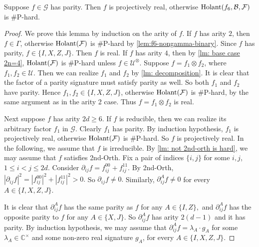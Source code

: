 \begin{lemma}\label{lm: realification when parity}
    Suppose $f\in \mathcal{G}$ has parity. 
    Then $f$ is projectively real, otherwise $\operatorname{Holant}(f_6,\mathcal{B},\mathcal{F})$ is \#P-hard.
\end{lemma}

\begin{proof}
    We prove this lemma by induction on the arity of $f$.
    If $f$ has arity $2$, then $f\in \Gamma$, otherwise $\operatorname{Holant}(\mathcal{F})$ is \#P-hard by \cref{lem:f6-nongamma-binary}.
    Since $f$ has parity, $f\in \{I,X,Z,J\}.$
    Then $f$ is real.
    If $f$ has arity $4$, then by \cref{lm: base case 2n=4}, $\operatorname{Holant}(\mathcal{F})$ is \#P-hard unless $f\in \mathcal{U}^{\otimes }$.
    Suppose $f=f_1\otimes f_2$, where $f_1,f_2\in \mathcal{U}.$
    Then we can realize $f_1$ and $f_2$ by \cref{lm: decomposition}.
    It is clear that the factor of a parity signature must satisfy parity as well.
    So both $f_1$ and $f_2$ have parity.
    Hence $f_1,f_2\in \{I,X,Z,J\}$, otherwise $\operatorname{Holant}(\mathcal{F})$ is \#P-hard, by the same argument as in the arity 2 case.
    Thus $f=f_1\otimes f_2$ is real.

    Next suppose $f$ has arity $2d\ge 6$.
    If $f$ is reducible, then we can realize its arbitrary factor $f_1$ in $\mathcal{G}$.
    Clearly $f_1$ has parity.
    By induction hypothesis, $f_1$ is projectively real, otherwise $\operatorname{Holant}(\mathcal{F})$ is \#P-hard.
    So $f$ is projectively real.
    In the following, we assume that $f$ is irreducible.
    By \cref{lm: not 2nd-orth is hard},
    we may assume that $f$ satisfies {\sc 2nd-Orth}. 
    Fix a pair of indices $\{i,j\}$ for some $i,j$, $1\le i<j \le 2d$.
    Consider $\partial_{ij}f=f_{ij}^{00}+f_{ij}^{11}$.
    By {\sc 2nd-Orth}, $|\partial_{ij}f|^2=|f_{ij}^{00}|^2+|f_{ij}^{11}|^2>0.$
    So $\partial_{ij}f\neq 0.$
    Similarly, $\partial^{A}_{ij}f\neq 0$ for every $A\in\{I,X,Z,J\}.$

    It is clear that $\partial_{ij}^Af$ has the same parity as $f$ for any $A\in \{I,Z\},$ and $\partial_{ij}^Af$ has the opposite parity to $f$ for any $A\in \{X,J\}.$
    So $\partial_{ij}^Af$ has arity $2(d-1)$ and it has parity.
    By induction hypothesis,
    we may assume that $\partial_{ij}^Af=\lambda_A\cdot  g_A$ for some $\lambda_{A}\in \mathbb{C}^{\times}$ and some non-zero real signature $g_A$, for every $A\in \{I,X,Z,J\}.$
    

\end{proof}
